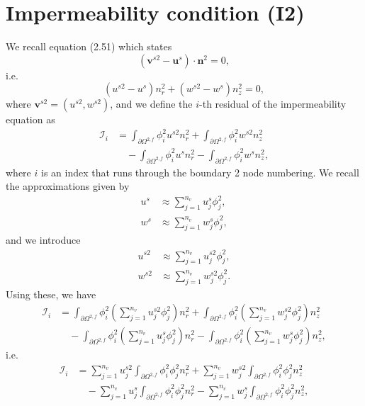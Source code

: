 \documentclass{article}
\begin{document}
\section{Impermeability condition (I2)} %
We recall equation (2.51) which states
\begin{equation}
\left( \mathbf{v}^{s2} - \mathbf{u}^s \right) \cdot \mathbf{n}^2 = 0, \tag{8.1}
\end{equation}
i.e.
\begin{equation}
(u^{s2} - u^s) n_r^2 + (w^{s2} - w^s) n_z^2 = 0, \tag{8.2}
\end{equation}
where $\mathbf{v}^{s2} = (u^{s2}, w^{s2})$, and we define the $i$-th residual of the impermeability equation as
\begin{align}
\mathcal{I}_i &= \int_{\partial \Omega^{2,f}} \phi_i^2 u^{s2} n_r^2 + \int_{\partial \Omega^{2,f}} \phi_i^2 w^{s2} n_z^2 \nonumber\\
&\quad - \int_{\partial \Omega^{2,f}} \phi_i^2 u^s n_r^2 - \int_{\partial \Omega^{2,f}} \phi_i^2 w^s n_z^2, \tag{8.3}
\end{align}
where $i$ is an index that runs through the boundary 2 node numbering.
We recall the approximations given by
\begin{align}
u^s &\approx \sum_{j=1}^{n_v} u_j^s \phi_j^2, \tag{8.4} \\
w^s &\approx \sum_{j=1}^{n_v} w_j^s \phi_j^2, \tag{8.5}
\end{align}
and we introduce
\begin{align}
u^{s2} &\approx \sum_{j=1}^{n_v} u_j^{s2} \phi_j^2, \tag{8.6} \\
w^{s2} &\approx \sum_{j=1}^{n_v} w_j^{s2} \phi_j^2. \tag{8.7}
\end{align}
Using these, we have
\begin{align}
\mathcal{I}_i &= \int_{\partial \Omega^{2,f}} \phi_i^2 \left( \sum_{j=1}^{n_v} u_j^{s2} \phi_j^2 \right) n_r^2 + \int_{\partial \Omega^{2,f}} \phi_i^2 \left( \sum_{j=1}^{n_v} w_j^{s2} \phi_j^2 \right) n_z^2 \nonumber\\
&\quad - \int_{\partial \Omega^{2,f}} \phi_i^2 \left( \sum_{j=1}^{n_v} u_j^s \phi_j^2 \right) n_r^2 - \int_{\partial \Omega^{2,f}} \phi_i^2 \left( \sum_{j=1}^{n_v} w_j^s \phi_j^2 \right) n_z^2, \tag{8.8}
\end{align}
i.e.
\begin{align}
\mathcal{I}_i &= \sum_{j=1}^{n_v} u_j^{s2} \int_{\partial \Omega^{2,f}} \phi_i^2 \phi_j^2 n_r^2 + \sum_{j=1}^{n_v} w_j^{s2} \int_{\partial \Omega^{2,f}} \phi_i^2 \phi_j^2 n_z^2 \nonumber\\
&\quad - \sum_{j=1}^{n_v} u_j^s \int_{\partial \Omega^{2,f}} \phi_i^2 \phi_j^2 n_r^2 - \sum_{j=1}^{n_v} w_j^s \int_{\partial \Omega^{2,f}} \phi_i^2 \phi_j^2 n_z^2, \tag{8.9}
\end{align}
\end{document}
